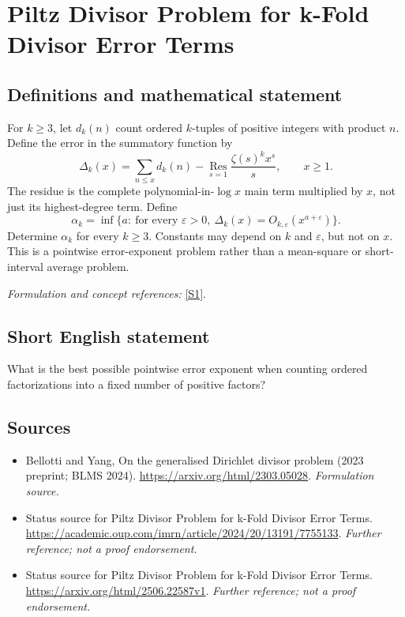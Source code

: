 \documentclass[11pt]{article}
\begin{document}
\section*{\texorpdfstring{Piltz Divisor Problem for k-Fold Divisor Error Terms}{Piltz Divisor Problem for k-Fold Divisor Error Terms}}\label{statement}
\subsection{Definitions and mathematical statement}
For $k\ge3$, let $d_k(n)$ count ordered $k$-tuples of positive integers with product $n$. Define the error in the summatory function by
\[
 \Delta_k(x)=\sum_{n\le x}d_k(n)
 -\operatorname*{Res}_{s=1}\frac{\zeta(s)^k x^s}{s},\qquad x\ge1.
\]
The residue is the complete polynomial-in-$\log x$ main term multiplied by $x$, not just its highest-degree term. Define
\[
 \alpha_k=\inf\{a:\ \text{for every }{\varepsilon}>0,
 \ \Delta_k(x)=O_{k,{\varepsilon}}(x^{a+{\varepsilon}})\}.
\]
Determine $\alpha_k$ for every $k\ge3$. Constants may depend on $k$ and ${\varepsilon}$, but not on $x$. This is a pointwise error-exponent problem rather than a mean-square or short-interval average problem.
\par\smallskip\textit{Formulation and concept references:} \href{https://arxiv.org/html/2303.05028}{[S1]}.

\subsection{Short English statement}
What is the best possible pointwise error exponent when counting ordered factorizations into a fixed number of positive factors?
\subsection{Sources}
\begin{itemize}
\item[S1]Bellotti and Yang, On the generalised Dirichlet divisor problem (2023 preprint; BLMS 2024).
\url{https://arxiv.org/html/2303.05028}.
\textit{Formulation source.}
\item[S2]Status source for Piltz Divisor Problem for k-Fold Divisor Error Terms.
\url{https://academic.oup.com/imrn/article/2024/20/13191/7755133}.
\textit{Further reference; not a proof endorsement.}
\item[S3]Status source for Piltz Divisor Problem for k-Fold Divisor Error Terms.
\url{https://arxiv.org/html/2506.22587v1}.
\textit{Further reference; not a proof endorsement.}
\end{itemize}
\end{document}
